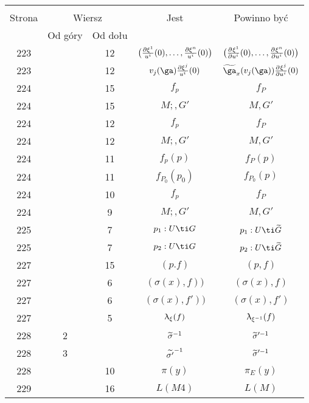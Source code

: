\documentclass[a4paper,11pt]{article}
\begin{document}
\begin{center}
  \begin{tabular}{|c|c|c|c|c|}
    \hline
    & \multicolumn{2}{c|}{} & & \\
    Strona & \multicolumn{2}{c|}{Wiersz} & Jest
                              & Powinno być \\ \cline{2-3}
    & Od góry & Od dołu & & \\
    \hline
    223 & & 12 & $\big( \frac{ \partial \xi^{ 1 } }{ u^{ i } }( 0 ), \ldots,
                 \frac{ \partial \xi^{ n } }{ u^{ i } }( 0 ) \big)$
           & $\big( \frac{ \partial^{  } {  { \xi^{ 1 } }  } }{ \partial {  { u^{ i } }  }^{  } }( 0 ), \ldots,
             \frac{ \partial^{  } {  { \xi^{ n } }  } }{ \partial {  { u^{ i } }  }^{  } }( 0 ) \big)$ \\
    223 & & 12 & $v_{ j }( \ga ) \fr{ \pr \xi ^{ j } }{ u^{ i } }( 0 )$
           & $\wt{ \ga }_{ x }( v_{ j }( \ga ) )
             \pd{}{ { \xi ^{ j } } }{ { u^{ i } } }( 0 )$ \\
    224 & & 15 & $f_{ p }$ & $f_{ P }$ \\
    224 & & 15 & $M;, G'$ & $M, G'$ \\
    224 & & 12 & $f_{ p }$ & $f_{ P }$ \\
    224 & & 12 & $M;, G'$ & $M, G'$ \\
    224 & & 11 & $f_{ p }( p )$ & $f_{ P }( p )$ \\
    224 & & 11 & $f_{ P_{ 0 } }( p_{ 0 } )$ & $f_{ P_{ 0 } }( p )$ \\
    224 & & 10 & $f_{ p }$ & $f_{ P }$ \\
    224 & &  9 & $M;, G'$ & $M, G'$ \\
    225 & &  7 & $p_{ 1 } : U \ti G$ & $p_{ 1 } : U \ti \wt{ G }$ \\
    225 & &  7 & $p_{ 2 } : U \ti G$ & $p_{ 2 } : U \ti \wt{ G }$ \\
    227 & & 15 & $( p. f )$ & $( p, f )$ \\
    227 & &  6 & $( \sigma( x ), f ) )$ & $( \sigma( x ), f )$ \\
    227 & &  6 & $( \sigma( x ), f' ) )$ & $( \sigma( x ), f' )$ \\
    227 & &  5 & $\uplambda_{ \xi }( f )$ & $\uplambda_{ \xi^{ -1 } }( f )$ \\
    228 &  2 & & $\widetilde{ \sigma }^{ -1 }$ & $\widetilde{ \sigma }'^{ -1 }$ \\
    228 &  3 & & $\widetilde{ \sigma' }^{ -1 }$ & $\widetilde{ \sigma }'^{ -1 }$ \\
    228 & & 10 & $\pi( y )$ & $\pi_{ E }( y )$ \\
    229 & & 16 & $L( M 4 )$ & $L( M )$ \\

\end{tabular}
\end{center}
\end{document}
